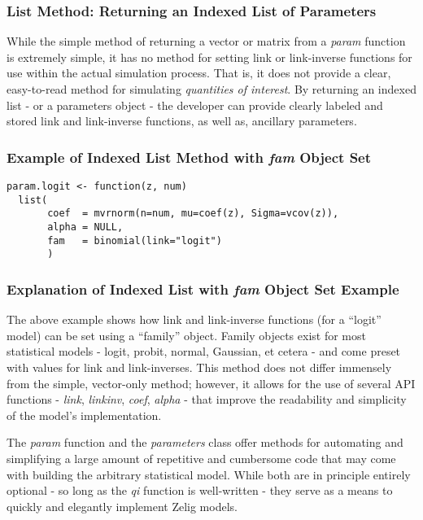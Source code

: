 \subsubsection{List Method: Returning an Indexed List of Parameters}

While the simple method of returning a vector or matrix from a \emph{param} function is extremely simple, it has no method for setting link or link-inverse functions for use within the actual simulation process.  That is, it does not provide a clear, easy-to-read method for simulating \emph{quantities of interest}.  By returning an indexed list - or a parameters object - the developer can provide clearly labeled and stored link and link-inverse functions, as well as, ancillary parameters.


\subsubsection{Example of Indexed List Method with \emph{fam} Object Set}

\begin{verbatim}
param.logit <- function(z, num)
  list(
       coef  = mvrnorm(n=num, mu=coef(z), Sigma=vcov(z)),
       alpha = NULL,
       fam   = binomial(link="logit")
       )
\end{verbatim}


\subsubsection{Explanation of Indexed List with \emph{fam} Object Set Example}

The above example shows how link and link-inverse functions (for a ``logit'' model) can be set using a ``family'' object.  Family objects exist for most statistical models - logit, probit, normal, Gaussian, et cetera - and come preset with values for link and link-inverses.  This method does not differ immensely from the simple, vector-only method; however, it allows for the use of several API functions - \emph{link}, \emph{linkinv}, \emph{coef}, \emph{alpha} - that improve the readability and simplicity of the model's implementation.

The \emph{param} function and the \emph{parameters} class offer methods for automating and simplifying a large amount of repetitive and cumbersome code that may come with building the arbitrary statistical model.  While both are in principle entirely optional - so long as the \emph{qi} function is well-written - they serve as a means to quickly and elegantly implement Zelig models.


